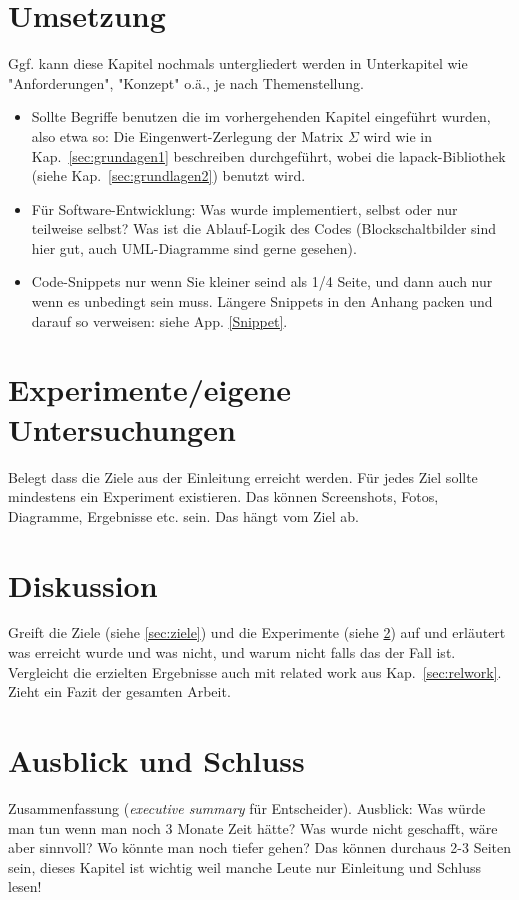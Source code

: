 \documentclass[12pt,oneside]{article}
\begin{document}
%
\section{Umsetzung}\label{sec:umsetzung}
Ggf. kann diese Kapitel nochmals untergliedert werden in Unterkapitel wie "Anforderungen", "Konzept" o.ä., je nach Themenstellung.

\begin{itemize}
\item Sollte Begriffe benutzen die im vorhergehenden Kapitel eingeführt wurden, also etwa so: Die Eingenwert-Zerlegung der Matrix $\Sigma$ wird wie in Kap.~\ref{sec:grundagen1} beschreiben durchgeführt, wobei die lapack-Bibliothek (siehe Kap.~\ref{sec:grundlagen2}) benutzt wird.

\item Für Software-Entwicklung: Was wurde implementiert, selbst oder nur teilweise selbst? Was ist die Ablauf-Logik des Codes (Blockschaltbilder sind hier gut, auch UML-Diagramme sind gerne gesehen).

\item Code-Snippets nur wenn Sie kleiner seind als 1/4 Seite, und dann auch nur wenn es unbedingt sein muss.
Längere Snippets in den Anhang packen und darauf so verweisen: siehe App. \ref{Snippet}.
\end{itemize}

\section{Experimente/eigene Untersuchungen}\label{sec:exp}
Belegt dass die Ziele aus der Einleitung erreicht werden. Für jedes Ziel sollte mindestens ein Experiment existieren. Das können Screenshots, Fotos, Diagramme, Ergebnisse etc. sein. Das hängt vom Ziel ab.

\section{Diskussion}
Greift die Ziele (siehe \ref{sec:ziele}) und die Experimente (siehe \ref{sec:exp}) auf und erläutert was erreicht wurde und was nicht, und warum nicht falls das der Fall ist. Vergleicht die erzielten Ergebnisse auch mit related work aus Kap.~\ref{sec:relwork}. Zieht ein Fazit der gesamten Arbeit.

\section{Ausblick und Schluss}
Zusammenfassung (\textit{executive summary} für Entscheider). Ausblick: Was würde man tun wenn man noch 3 Monate Zeit hätte? Was wurde nicht geschafft, wäre aber sinnvoll? Wo könnte man noch tiefer gehen? Das können durchaus 2-3 Seiten sein, dieses Kapitel ist wichtig weil manche Leute nur Einleitung und Schluss lesen!
\end{document}
